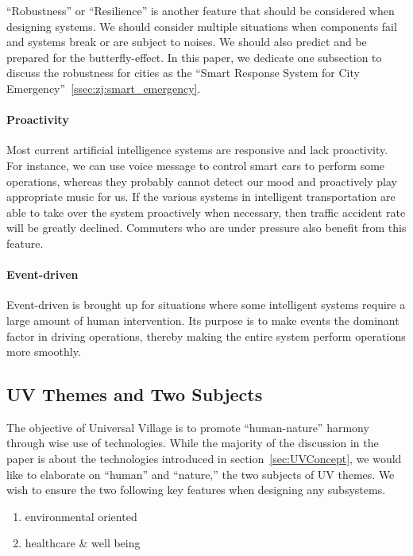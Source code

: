\documentclass[letterpaper, twocolumn, 10pt, conference]{IEEEtran}
\begin{document}
\enquote{Robustness} or \enquote{Resilience} is another feature that should be considered when designing systems. We should consider multiple situations when components fail and systems break or are subject to noises. We should also predict and be prepared for the butterfly-effect.  In this paper, we dedicate one subsection to discuss the robustness for cities as  the \enquote{Smart Response System for City Emergency}~\ref{ssec:zj:smart_emergency}.

\paragraph{Proactivity}


Most current artificial intelligence systems are responsive and lack proactivity. For instance, we can use voice message to control smart cars to perform some operations, whereas they probably cannot detect our mood and proactively play appropriate music for us. If the various systems in intelligent transportation are able to take over the system proactively when necessary, then traffic accident rate will be greatly declined.  Commuters who are under pressure also benefit from this feature.


\paragraph{Event-driven}

Event-driven is brought up for situations where some intelligent systems require a large amount of human intervention. Its purpose is to make events the dominant factor in driving operations, thereby making the entire system perform operations more smoothly.


\subsection{UV Themes and Two Subjects}
\label{ssec:Theme}

The objective of Universal Village is to promote \enquote{human-nature} harmony through wise use of technologies. While the majority of the discussion in the paper is about the technologies introduced in section~\ref{sec:UVConcept}, we would like to elaborate on \enquote{human} and \enquote{nature,} the two subjects of UV themes. We wish to ensure the two following key features when designing any subsystems.  
 
\begin{enumerate}
	\item environmental oriented
	\item healthcare \& well being
\end{enumerate}
\end{document}
